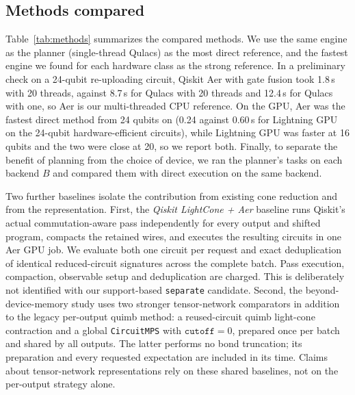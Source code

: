 \subsection{Methods compared}
Table~\ref{tab:methods} summarizes the compared methods. We use the same engine as the planner (single-thread Qulacs) as the most direct reference, and the fastest engine we found for each hardware class as the strong reference. In a preliminary check on a 24-qubit re-uploading circuit, Qiskit Aer with gate fusion took 1.8\,s with 20 threads, against 8.7\,s for Qulacs with 20 threads and 12.4\,s for Qulacs with one, so Aer is our multi-threaded CPU reference. On the GPU, Aer was the fastest direct method from 24 qubits on (0.24 against 0.60\,s for Lightning GPU on the 24-qubit hardware-efficient circuits), while Lightning GPU was faster at 16 qubits and the two were close at 20, so we report both. Finally, to separate the benefit of planning from the choice of device, we ran the planner's tasks on each backend $B$ and compared them with direct execution on the same backend.

Two further baselines isolate the contribution from existing cone reduction and from the representation. First, the \emph{Qiskit LightCone + Aer} baseline runs Qiskit's actual commutation-aware pass independently for every output and shifted program, compacts the retained wires, and executes the resulting circuits in one Aer GPU job. We evaluate both one circuit per request and exact deduplication of identical reduced-circuit signatures across the complete batch. Pass execution, compaction, observable setup and deduplication are charged. This is deliberately not identified with our support-based \texttt{separate} candidate. Second, the beyond-device-memory study uses two stronger tensor-network comparators in addition to the legacy per-output quimb method: a reused-circuit quimb light-cone contraction and a global \texttt{CircuitMPS} with $\texttt{cutoff}=0$, prepared once per batch and shared by all outputs. The latter performs no bond truncation; its preparation and every requested expectation are included in its time. Claims about tensor-network representations rely on these shared baselines, not on the per-output strategy alone.

